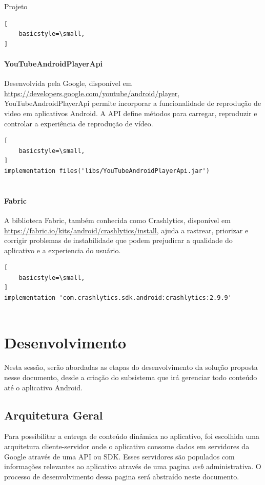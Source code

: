 \documentclass[
	12pt,				%
	openright,			%
	twoside,			%
	a4paper,			%
	english,			%
	french,				%
	spanish,			%
	brazil				%
	]{abntex2}
\begin{document}
\begin{chapter}{Projeto}
\begin{lstlisting}[
    basicstyle=\small,
]
\end{lstlisting}
   \paragraph{YouTubeAndroidPlayerApi}
   Desenvolvida pela Google, disponível em \url{https://developers.google.com/youtube/android/player}, YouTubeAndroidPlayerApi permite incorporar a funcionalidade de reprodução de video em aplicativos Android. A API  define métodos para carregar, reproduzir 
e controlar a experiência de reprodução de vídeo.
      \begin{lstlisting}[
    basicstyle=\small,
]
implementation files('libs/YouTubeAndroidPlayerApi.jar')
   
\end{lstlisting}
   \paragraph{Fabric}
   A biblioteca Fabric, também conhecida como Crashlytics, disponível em \url{https://fabric.io/kits/android/crashlytics/install}, ajuda a rastrear, priorizar e corrigir problemas de instabilidade que podem prejudicar a qualidade do aplicativo e a experiencia do usuário.
   \begin{lstlisting}[
    basicstyle=\small,
]
implementation 'com.crashlytics.sdk.android:crashlytics:2.9.9'
   
\end{lstlisting}


\section{Desenvolvimento}
Nesta sessão, serão abordadas as etapas do desenvolvimento da solução proposta nesse documento, desde a criação do subsistema que irá gerenciar todo conteúdo até o aplicativo Android. 

\subsection{Arquitetura Geral}
Para possibilitar a entrega de conteúdo dinâmica no aplicativo, foi escolhida uma arquitetura cliente-servidor onde o aplicativo consome dados em servidores da Google através de uma API ou SDK. Esses servidores são populados com informações relevantes ao aplicativo através de uma pagina \textit{web} administrativa. O processo de desenvolvimento dessa pagina será abstraído neste documento.\\



\end{chapter}
\end{document}
